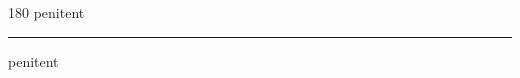 
\begin{frame}
\begin{center}
\begin{turn}{180}
{\fontsize{2.5cm}{1em}\selectfont penitent}
\end{turn}
\vspace{1em}\par  
\hrule
\vspace{1em}\par  
{\fontsize{2.5cm}{1em}\selectfont penitent}
\end{center}
\end{frame}
